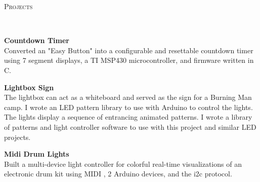\documentclass{article}
\newenvironment{changemargin}[2]{%
  \begin{list}{}{%
    \setlength{\topsep}{0pt}%
    \setlength{\leftmargin}{#1}%
    \setlength{\rightmargin}{#2}%
    \setlength{\listparindent}{\parindent}%
    \setlength{\itemindent}{\parindent}%
    \setlength{\parsep}{\parskip}%
  }%
  \item[]}{\end{list}
}
\newcommand{\lineover}{
	\begin{changemargin}{-0.05in}{-0.05in}
		\vspace*{-8pt}
		\hrulefill \\
		\vspace*{-2pt}
	\end{changemargin}
}
\newcommand{\header}[1]{
	\begin{changemargin}{-0.5in}{-0.5in}
		\scshape{#1}\\
  	\lineover
	\end{changemargin}
}
\newenvironment{body} {
	\vspace*{-16pt}
	\begin{changemargin}{-0.25in}{-0.5in}
  }	
	{\end{changemargin}
}
\begin{document}
\header{Projects}
\begin{body}
	\vspace{20pt}

	\textbf{Countdown Timer}\\
	Converted an "Easy Button" into a configurable and resettable countdown timer 
	using 7 segment displays, a TI MSP430 microcontroller, and firmware written in C.
	
	\vspace{8pt}
	\textbf{Lightbox Sign}\\
	The lightbox can act as a whiteboard and served as the sign for a Burning Man camp. I wrote an LED pattern library to use with Arduino to control the lights. The lights display a sequence of entrancing animated patterns. I wrote a library of patterns and light controller software to use with this project and similar LED projects.

	\vspace{8pt}
	\textbf{Midi Drum Lights}\\
	Built a multi-device light controller for colorful real-time visualizations of an electronic drum kit using MIDI , 2 Arduino devices, and the i2c protocol.
		
\end{body}
\end{document}
